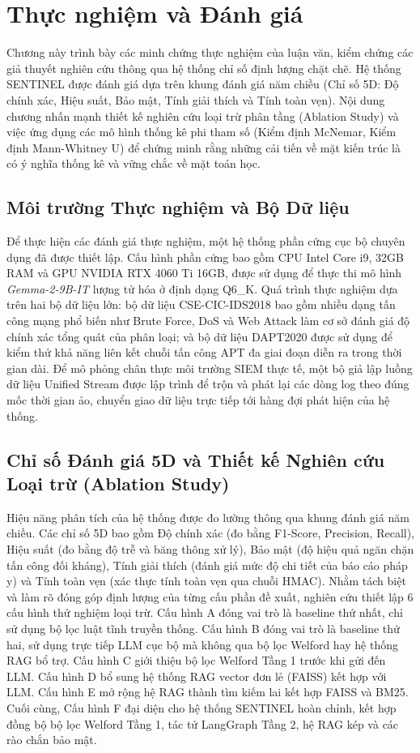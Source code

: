 \chapter{Thực nghiệm và Đánh giá}
\label{ch:experiments_evaluation}

Chương này trình bày các minh chứng thực nghiệm của luận văn, kiểm chứng các giả thuyết nghiên cứu thông qua hệ thống chỉ số định lượng chặt chẽ. Hệ thống SENTINEL được đánh giá dựa trên khung đánh giá năm chiều (Chỉ số 5D: Độ chính xác, Hiệu suất, Bảo mật, Tính giải thích và Tính toàn vẹn). Nội dung chương nhấn mạnh thiết kế nghiên cứu loại trừ phân tầng (Ablation Study) và việc ứng dụng các mô hình thống kê phi tham số (Kiểm định McNemar, Kiểm định Mann-Whitney U) để chứng minh rằng những cải tiến về mặt kiến trúc là có ý nghĩa thống kê và vững chắc về mặt toán học.

\section{Môi trường Thực nghiệm và Bộ Dữ liệu}
Để thực hiện các đánh giá thực nghiệm, một hệ thống phần cứng cục bộ chuyên dụng đã được thiết lập. Cấu hình phần cứng bao gồm CPU Intel Core i9, 32GB RAM và GPU NVIDIA RTX 4060 Ti 16GB, được sử dụng để thực thi mô hình \textit{Gemma-2-9B-IT} lượng tử hóa ở định dạng Q6\_K. Quá trình thực nghiệm dựa trên hai bộ dữ liệu lớn: bộ dữ liệu CSE-CIC-IDS2018 bao gồm nhiều dạng tấn công mạng phổ biến như Brute Force, DoS và Web Attack làm cơ sở đánh giá độ chính xác tổng quát của phân loại; và bộ dữ liệu DAPT2020 được sử dụng để kiểm thử khả năng liên kết chuỗi tấn công APT đa giai đoạn diễn ra trong thời gian dài. Để mô phỏng chân thực môi trường SIEM thực tế, một bộ giả lập luồng dữ liệu Unified Stream được lập trình để trộn và phát lại các dòng log theo đúng mốc thời gian ảo, chuyển giao dữ liệu trực tiếp tới hàng đợi phát hiện của hệ thống.

\section{Chỉ số Đánh giá 5D và Thiết kế Nghiên cứu Loại trừ (Ablation Study)}
Hiệu năng phân tích của hệ thống được đo lường thông qua khung đánh giá năm chiều. Các chỉ số 5D bao gồm Độ chính xác (đo bằng F1-Score, Precision, Recall), Hiệu suất (đo bằng độ trễ và băng thông xử lý), Bảo mật (độ hiệu quả ngăn chặn tấn công đối kháng), Tính giải thích (đánh giá mức độ chi tiết của báo cáo pháp y) và Tính toàn vẹn (xác thực tính toàn vẹn qua chuỗi HMAC). Nhằm tách biệt và làm rõ đóng góp định lượng của từng cấu phần đề xuất, nghiên cứu thiết lập 6 cấu hình thử nghiệm loại trừ. Cấu hình A đóng vai trò là baseline thứ nhất, chỉ sử dụng bộ lọc luật tĩnh truyền thống. Cấu hình B đóng vai trò là baseline thứ hai, sử dụng trực tiếp LLM cục bộ mà không qua bộ lọc Welford hay hệ thống RAG bổ trợ. Cấu hình C giới thiệu bộ lọc Welford Tầng 1 trước khi gửi đến LLM. Cấu hình D bổ sung hệ thống RAG vector đơn lẻ (FAISS) kết hợp với LLM. Cấu hình E mở rộng hệ RAG thành tìm kiếm lai kết hợp FAISS và BM25. Cuối cùng, Cấu hình F đại diện cho hệ thống SENTINEL hoàn chỉnh, kết hợp đồng bộ bộ lọc Welford Tầng 1, tác tử LangGraph Tầng 2, hệ RAG kép và các rào chắn bảo mật.

